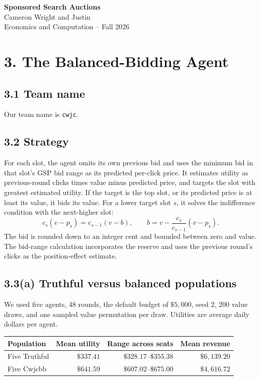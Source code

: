 \documentclass[10pt]{article}
\begin{document}
\begin{center}
{\LARGE\bfseries Sponsored Search Auctions}\\[3pt]
{\large Cameron Wright and Justin}\\
Economics and Computation -- Fall 2026
\end{center}

\section*{3. The Balanced-Bidding Agent}

\subsection*{3.1 Team name}
Our team name is \texttt{cwjc}.

\subsection*{3.2 Strategy}
For each slot, the agent omits its own previous bid and uses the minimum bid in that slot's GSP bid range as its predicted per-click price. It estimates utility as previous-round clicks times value minus predicted price, and targets the slot with greatest estimated utility. If the target is the top slot, or its predicted price is at least its value, it bids its value. For a lower target slot $s$, it solves the indifference condition with the next-higher slot:
\[
c_s(v-p_s)=c_{s-1}(v-b),\qquad
b=v-\frac{c_s}{c_{s-1}}(v-p_s).
\]
The bid is rounded down to an integer cent and bounded between zero and value. The bid-range calculation incorporates the reserve and uses the previous round's clicks as the position-effect estimate.

\subsection*{3.3(a) Truthful versus balanced populations}
We used five agents, 48 rounds, the default budget of $\$5{,}000$, seed 2, 200 value draws, and one sampled value permutation per draw. Utilities are average daily dollars per agent.

\begin{center}
\begin{tabular}{lrrr}
\toprule
Population & Mean utility & Range across seats & Mean revenue \\
\midrule
Five Truthful & $\$337.41$ & $\$328.17$--$\$355.38$ & $\$6{,}139.20$ \\
Five Cwjcbb & $\$641.59$ & $\$607.02$--$\$675.00$ & $\$4{,}616.72$ \\
\bottomrule
\end{tabular}
\end{center}
\end{document}
